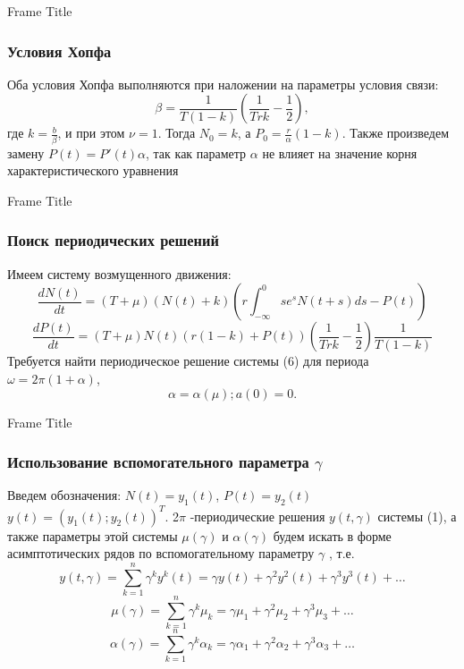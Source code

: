 \documentclass[12pt]{beamer}
\begin{document}
\begin{frame}{Frame Title}
\frametitle{Условия Хопфа}
     Оба условия Хопфа выполняются при наложении на параметры условия связи:
 \begin{equation*}
     \beta=\frac{1}{T(1-k)} \left(\frac{1}{T r k} - \frac{1}{2}\right),
\end{equation*}
 где $k=\frac{b}{\beta}$, и при этом $\nu=1$. Тогда $N_0=k$, а $P_0=\frac{r}{\alpha} (1-k)$. Также произведем замену $P(t)=P'(t)\alpha$, так как параметр $\alpha$ не влияет на значение корня характеристического уравнения
\end{frame}
\begin{frame}{Frame Title}
\frametitle{Поиск периодических решений}
    Имеем систему возмущенного движения:
  \begin{equation}
      \frac{d N(t)}{d t}= (T+\mu)(N(t)+k)\left( r\int_{-\infty}^{0} s e^s  N(t+s) d s - P(t) \right)
  \end{equation}
\begin{equation*}
      \frac{d P(t)}{d t}= (T+\mu)N(t)( r(1-k) + P(t) )\left( \frac{1}{T r k} - \frac{1}{2}\right)\frac{1}{T(1-k)}
  \end{equation*}
  Требуется найти периодическое решение системы (6) для периода $\omega=2 \pi (1+\alpha)$,
   \begin{equation*}
       \alpha=\alpha (\mu); a(0)=0.
       \end{equation*}
\end{frame}
\begin{frame}{Frame Title}
\frametitle{Использование вспомогательного параметра $\gamma$}
     Введем обозначения: $N(t)=y_1 (t)$, $P(t)=y_2 (t)$ $y(t)=(y_1 (t); y_2(t))^T$. 2$\pi$ -периодические решения $y(t,\gamma)$ системы (1), а также параметры этой системы $\mu(\gamma)$ и $\alpha(\gamma)$ будем искать в форме асимптотических рядов по вспомогательному параметру $\gamma$ \cite{has}, т.е.
  \begin{equation}
      y(t,\gamma)=\sum_{k=1}^n \gamma^k y^k (t)= \gamma y(t)+\gamma^2 y^2(t)+\gamma^3 y^3(t)+\ldots
 \label{math/2}
  \end{equation}
   \begin{equation} \label{mu}
       \mu(\gamma)=\sum_{k=1}^n \gamma^k \mu_k = \gamma \mu_1+\gamma^2 \mu_2+\gamma^3 \mu_3+\ldots
  \end{equation}
  \begin{equation}
       \alpha(\gamma)=\sum_{k=1}^n \gamma^k \alpha_k = \gamma \alpha_1+\gamma^2 \alpha_2+\gamma^3 \alpha_3+\ldots
  \end{equation}
\end{frame}
\end{document}

